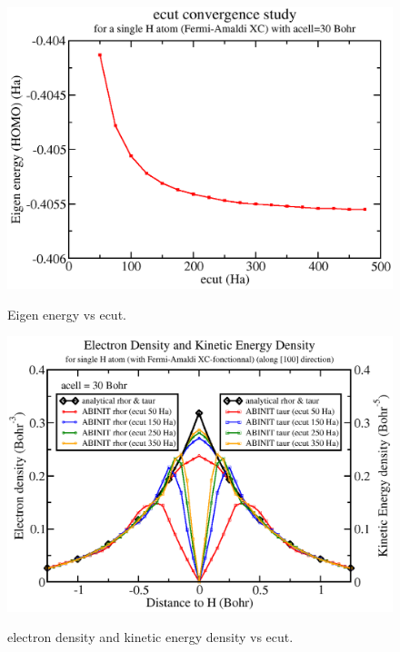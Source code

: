 \documentclass[a4paper,12pt]{report}
\begin{document}
\begin{figure}[!h]
\centering
\begin{minipage}[c]{0.7\textwidth}
\includegraphics[width = \textwidth]{eigval_vs_ecut_crop}
\end{minipage}
\vspace{0.12\textwidth}
\begin{minipage}[c]{0.7\textwidth}
\caption{\small Eigen energy vs ecut.}
\vspace*{1.0ex}
\label{eig_ecut}
\end{minipage}
\end{figure}

\begin{figure}[!h]
\centering
\begin{minipage}[c]{1.0\textwidth}
\includegraphics[width = \textwidth]{H_DEN_KDEN_line100_ecut_crop}
\end{minipage}
\vspace{0.12\textwidth}
\begin{minipage}[c]{0.7\textwidth}
\caption{\small electron density and kinetic energy density vs ecut.}
\vspace*{1.0ex}
\label{den_kden_ecut}
\end{minipage}
\end{figure}
\end{document}
